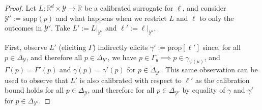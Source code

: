 \documentclass{article}
\newcommand{\reals}{\mathbb{R}}
\newcommand{\simplex}{\Delta_\Y}
\newcommand{\prop}[1]{\mathrm{prop}[#1]}
\newcommand{\supp}{\mathrm{supp}}
\newcommand{\Y}{\mathcal{Y}}
\begin{document}
\begin{proof}
	Let $L : \reals^d \times \Y \to \reals$ be a calibrated surrogate for $\ell$, and consider $\Y' := \supp(p)$ and what happens when we restrict $L$ and $\ell$ to only the outcomes in $\Y'$.
	Take $L' := L|_{\Y'}$ and $\ell' := \ell|_{\Y'}$.
	
	First, observe $L'$ (eliciting $\Gamma$) indirectly elicits $\gamma' := \prop{\ell'}$ since, for all $p \in \simplex$, and therefore all $p \in \Delta_{\Y'}$, we have $p \in \Gamma_u \implies p \in \gamma_{\psi(u)}$, and $\Gamma(p) = \Gamma'(p)$ and $\gamma(p) = \gamma'(p)$ for $p \in \Delta_{\Y'}$.
	This same observation can be used to observe that $L'$ is also calibrated with respect to $\ell'$ as the calibration bound holds for all $p \in \simplex$, and therefore for all $p \in \Delta_{\Y'}$ by equality of $\gamma$ and $\gamma'$ for $p \in \Delta_{\Y'}$.
	

\end{proof}
\end{document}
